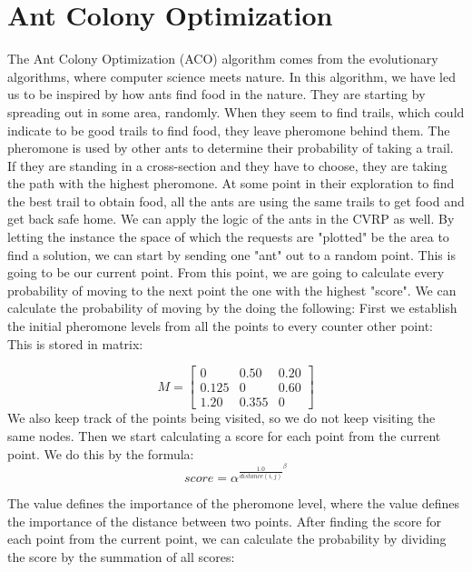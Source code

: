 \documentclass[12pt]{article}
\begin{document}


\newpage
\section{Ant Colony Optimization}
The Ant Colony Optimization (ACO) algorithm comes from the evolutionary algorithms, where computer science meets nature. In this algorithm, 
we have led us to be inspired by how ants find food in the nature. They are starting by spreading out in some area, randomly. When they seem to find trails, 
which could indicate to be good trails to find food, they leave pheromone behind them. The pheromone is used by other ants to determine their probability of taking 
a trail. If they are standing in a cross-section and they have to choose, they are taking the path with the highest pheromone. 
At some point in their exploration to find the best trail to obtain food, all the ants are using the same trails to get food and get back safe home. 
\newline
We can apply the logic of the ants in the CVRP as well. By letting the instance \- the space of which the requests are "plotted" \- be the area to find a solution, 
we can start by sending one "ant" out to a random point. This is going to be our current point. From this point, we are going to calculate every probability of moving to the next point \- the one with the highest "score". 
We can calculate the probability of moving by the doing the following: 
\newline
First we establish the initial pheromone levels from all the points to every counter other point: \\
This is stored in matrix: 

\[
M = \begin{bmatrix}
    0 & 0.50 & 0.20           \\[0.3em]
    0.125 & 0           & 0.60 \\[0.3em]
    1.20 & 0.355 & 0
\end{bmatrix}
\]
We also keep track of the points being visited, so we do not keep visiting the same nodes. Then we start calculating a score for each point from the current point.
We do this by the formula: \\


\begin{equation}
score = \alpha^{\frac{1.0}{distance(i,j)}^\beta}
\end{equation}

The \textalpha  value defines the importance of the pheromone level, where the \textbeta  value defines the importance of the distance between two points. After finding the score for 
each point from the current point, we can calculate the probability by dividing the score by the summation of all scores: \\
\end{document}
